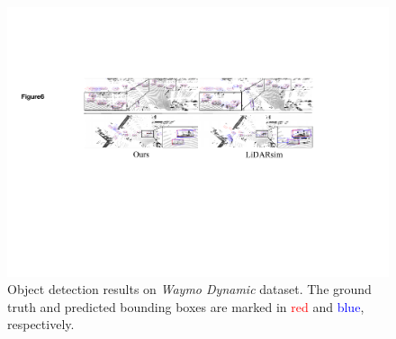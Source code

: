\begin{figure}[t]
    \centering
        \includegraphics[width=1\linewidth]{Figures/detection_result.pdf}
        
        \caption{Object detection results on \textit{Waymo Dynamic} dataset. The ground truth and predicted bounding boxes are marked in \textcolor{red}{red} and \textcolor{blue}{blue}, respectively.}
    \label{fig:detection}
    
\end{figure}